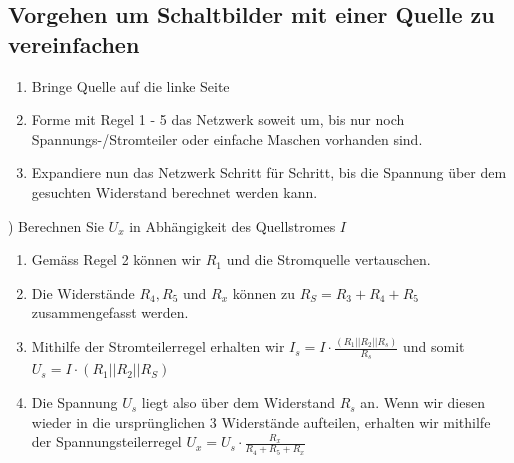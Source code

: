 										\iend


\newpage

										\subsection{Vorgehen um Schaltbilder mit einer Quelle zu vereinfachen}
										\begin{enumerate}
											\item Bringe Quelle auf die linke Seite
											\item Forme mit Regel 1 - 5 das Netzwerk soweit um, bis nur noch Spannungs-/Stromteiler oder einfache Maschen vorhanden sind.
											\item Expandiere nun das Netzwerk Schritt für Schritt, bis die Spannung über dem gesuchten Widerstand berechnet werden kann.
										\end{enumerate}

										) Berechnen Sie $U_x$ in Abhängigkeit des Quellstromes $I$
										\begin{center}
											\fix
										\end{center}
										\fix
										\iend
										\beginbsp
									 \begin{enumerate}
					  				 \item Gemäss Regel 2 können wir $R_1$ und die Stromquelle vertauschen.
										 \item Die Widerstände $R_4 , R_5$ und $ R_x $ können zu $ R_S = R_3 + R_4 + R_5 $ zusammengefasst werden.
										 \item Mithilfe der Stromteilerregel erhalten wir $ I_s = I \cdot \frac{(R_1 || R_2 || R_s)}{R_s} $ und somit $U_s = I \cdot (R_1 || R_2 || R_S) $
										 \item Die Spannung $U_s$ liegt also über dem Widerstand $R_s$ an. Wenn wir diesen wieder in die ursprünglichen 3 Widerstände aufteilen, erhalten wir mithilfe der Spannungsteilerregel $U_x = U_s \cdot \frac{R_x}{R_4 + R_5 + R_x} $
									 \end{enumerate}

